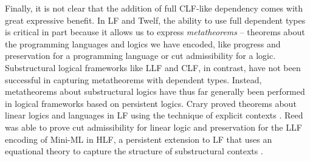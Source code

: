 Finally, it is not clear that the addition of full CLF-like dependency
comes with great expressive benefit. 
In LF and Twelf, the ability to use full dependent types is critical
in part because it allows us to express {\it metatheorems} -- theorems
about the programming languages and logics we have encoded, like
progress and preservation for a programming language or cut
admissibility for a logic. Substructural logical frameworks like LLF
and CLF, in contrast, have not been successful in capturing
metatheorems with dependent types. Instead, metatheorems about
substructural logics have thus far generally been performed in logical
frameworks based on persistent logics. Crary proved theorems about linear
logics and languages in LF using the technique of explicit contexts
\cite{crary10higher}. Reed was able to prove cut admissibility for
linear logic and preservation for the LLF encoding of Mini-ML in HLF,
a persistent extension to LF that uses an equational theory to capture
the structure of substructural contexts \cite{reed09hybrid}.






